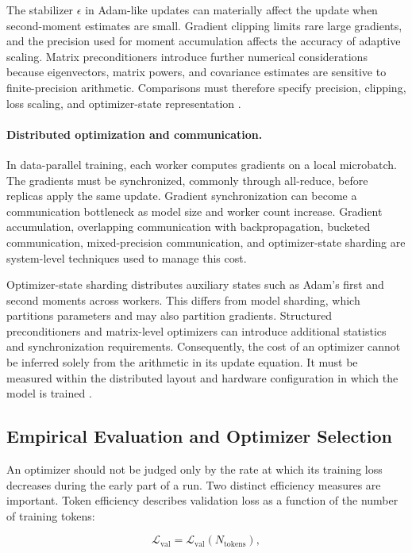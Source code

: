 The stabilizer $\epsilon$ in Adam-like updates can materially affect
the update when second-moment estimates are small. Gradient clipping
limits rare large gradients, and the precision used for moment
accumulation affects the accuracy of adaptive scaling. Matrix
preconditioners introduce further numerical considerations because
eigenvectors, matrix powers, and covariance estimates are sensitive
to finite-precision arithmetic. Comparisons must therefore specify
precision, clipping, loss scaling, and optimizer-state representation
\parencite{Ranganath2026Navigating}.

\paragraph{Distributed optimization and communication.}
In data-parallel training, each worker computes gradients on a local
microbatch. The gradients must be synchronized, commonly through
all-reduce, before replicas apply the same update. Gradient
synchronization can become a communication bottleneck as model size
and worker count increase. Gradient accumulation, overlapping
communication with backpropagation, bucketed communication,
mixed-precision communication, and optimizer-state sharding are
system-level techniques used to manage this cost.

Optimizer-state sharding distributes auxiliary states such as Adam's
first and second moments across workers. This differs from model
sharding, which partitions parameters and may also partition
gradients. Structured preconditioners and matrix-level optimizers
can introduce additional statistics and synchronization requirements.
Consequently, the cost of an optimizer cannot be inferred solely
from the arithmetic in its update equation. It must be measured
within the distributed layout and hardware configuration in which
the model is trained \parencite{Ranganath2026Navigating}.

\subsection{Empirical Evaluation and Optimizer Selection}
\label{subsec:optimization-evaluation}

An optimizer should not be judged only by the rate at which its
training loss decreases during the early part of a run. Two distinct
efficiency measures are important. Token efficiency describes
validation loss as a function of the number of training tokens:

\begin{equation}
    \mathcal{L}_{\mathrm{val}}
    =
    \mathcal{L}_{\mathrm{val}}(N_{\mathrm{tokens}}),
    \label{eq:opt-token-efficiency}
\end{equation}

